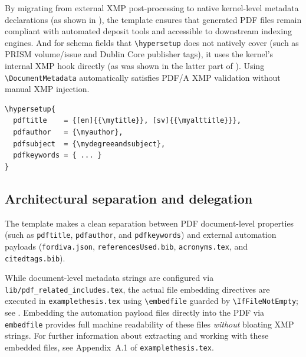 \documentclass[12pt, twoside]{article}
\newcommand{\fname}[1]{\texttt{#1}}
\begin{document}
By migrating from external \gls{XMP} post-processing to native kernel-level metadata declarations (as shown in ), the template ensures that generated \gls{PDF} files remain compliant with automated deposit tools and accessible to downstream indexing engines. And for schema fields that \texttt{\textbackslash hypersetup} does not natively cover (such as PRISM volume/issue and Dublin Core publisher tags), it uses the kernel’s internal \gls{XMP} hook directly (as was shown in the latter part of ). Using \texttt{\textbackslash DocumentMetadata} automatically satisfies PDF/A \gls{XMP} validation without manual \gls{XMP} injection.

\begin{lstlisting}[language={[LaTeX]TeX}, caption={Using \texttt{\textbackslash hypersetup} for some metadata}, label=lst:hypersetupMetadata]
\hypersetup{
  pdftitle    = {[en]{{\mytitle}}, [sv]{{\myalttitle}}},
  pdfauthor   = {\myauthor},
  pdfsubject  = {\mydegreeandsubject},
  pdfkeywords = { ... }
}
\end{lstlisting}

\subsection{Architectural separation and delegation}
\label{sec:metadataVersusEmbeddedFiles}
The template makes a clean separation between \gls{PDF} document-level properties (such as \texttt{pdftitle}, \texttt{pdfauthor}, and \texttt{pdfkeywords}) and external automation payloads (\fname{fordiva.json}, \fname{referencesUsed.bib}, \fname{acronyms.tex}, and \fname{citedtags.bib}). 

While document-level metadata strings are configured via \fname{lib/pdf\_related\_includes.tex}, the actual file embedding directives are executed in \fname{examplethesis.tex} using \texttt{\textbackslash embedfile} guarded by \texttt{\textbackslash IfFileNotEmpty}; see . Embedding the automation payload files directly into the \gls{PDF} via \texttt{embedfile} provides full machine readability of these files \textit{without} bloating \gls{XMP} strings. For further information about extracting and working with these embedded files, see Appendix~A.1 of \fname{examplethesis.tex}.
\end{document}
